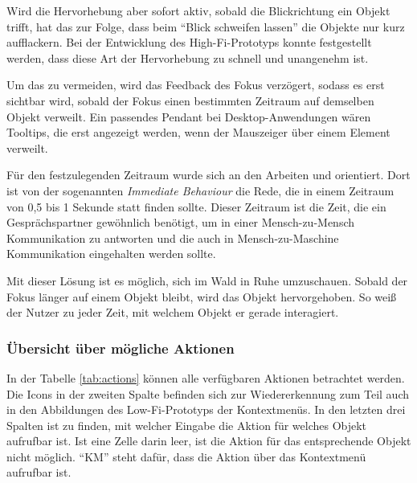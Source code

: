 Wird die Hervorhebung aber sofort aktiv, sobald die Blickrichtung ein Objekt trifft, hat das zur Folge, dass beim "`Blick schweifen lassen"' die Objekte nur kurz aufflackern. Bei der Entwicklung des High-Fi-Prototyps konnte festgestellt werden, dass diese Art der Hervorhebung zu schnell und unangenehm ist.

Um das zu vermeiden, wird das Feedback des Fokus verzögert, sodass es erst sichtbar wird, sobald der Fokus einen bestimmten Zeitraum auf demselben Objekt verweilt. Ein passendes Pendant bei Desktop-Anwendungen wären Tooltips, die erst angezeigt werden, wenn der Mauszeiger über einem Element verweilt.

Für den festzulegenden Zeitraum wurde sich an den Arbeiten \cite{miller1956magical} und \cite{mishunov2015why} orientiert. Dort ist von der sogenannten \textit{Immediate Behaviour} die Rede, die in einem Zeitraum von 0,5 bis 1 Sekunde statt finden sollte. Dieser Zeitraum ist die Zeit, die ein Gesprächspartner gewöhnlich benötigt, um in einer Mensch-zu-Mensch Kommunikation zu antworten und die auch in Mensch-zu-Maschine Kommunikation eingehalten werden sollte.

Mit dieser Lösung ist es möglich, sich im Wald in Ruhe umzuschauen. Sobald der Fokus länger auf einem Objekt bleibt, wird das Objekt hervorgehoben. So weiß der Nutzer zu jeder Zeit, mit welchem Objekt er gerade interagiert.

\subsubsection*{Übersicht über mögliche Aktionen}

In der Tabelle \ref{tab:actions} können alle verfügbaren Aktionen betrachtet werden. Die Icons in der zweiten Spalte befinden sich zur Wiedererkennung zum Teil auch in den Abbildungen des Low-Fi-Prototyps der Kontextmenüs. In den letzten drei Spalten ist zu finden, mit welcher Eingabe die Aktion für welches Objekt aufrufbar ist. Ist eine Zelle darin leer, ist die Aktion für das entsprechende Objekt nicht möglich. "`KM"' steht dafür, dass die Aktion über das Kontextmenü aufrufbar ist.

